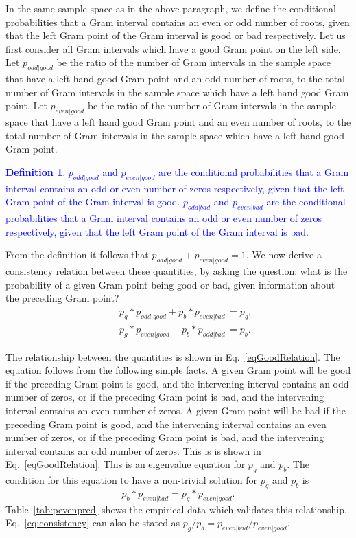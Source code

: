 \documentclass[twoside]{article}
\theoremstyle{definition}
\newtheorem{defn}{Definition}
\begin{document}
In the same sample space as in the above paragraph, we define the conditional probabilities that a Gram interval contains an even or odd number of roots, given that the left Gram point of the Gram interval is good or bad respectively. Let us first consider all Gram intervals which have a good Gram point on the left side. Let $p_{odd|good}$ be the ratio of the number of  Gram intervals in the sample space that have a left hand good Gram point and an odd number of roots, to the total number of Gram intervals in the sample space which have a left hand good Gram point. Let $p_{even|good}$ be the ratio of the number of  Gram intervals in the sample space that have a left hand good Gram point and an even number of roots, to the total number of Gram intervals in the sample space which have a left hand good Gram point. 
\textcolor{blue}{
\begin{defn}\label{poddgood}
$p_{odd|good}$ and $p_{even|good}$ are the conditional probabilities that a Gram interval contains an odd or even number of zeros respectively, given that the left Gram point of the Gram interval is good. $p_{odd|bad}$ and $p_{even|bad}$ are the conditional probabilities that a Gram interval contains an odd or even number of zeros respectively, given that the left Gram point of the Gram interval is bad.
\end{defn} 
}
From the definition it follows that $p_{odd|good} + p_{even|good} = 1$.  
We now derive a consistency relation between these quantities, by asking the question: what is the probability of a given Gram point being good or bad, given information about the preceding Gram point? 
\begin{eqnarray}
&&p_g*p_{odd|good}  + p_b*p_{even|bad}\, =  p_g,\nonumber\\
&&p_g*p_{even|good} + p_b*p_{odd|bad}\, = p_b.
\label{eqGoodRelation}
\end{eqnarray}

The relationship between the quantities is shown in Eq.~\ref{eqGoodRelation}. The equation follows from the following simple facts. A given Gram point will be good if the preceding Gram point is good, and the intervening interval contains an odd number of zeros, or if the preceding Gram point is bad, and the intervening interval contains an even number of zeros. A given Gram point will be bad if the preceding Gram point is good, and the intervening interval contains an even number of zeros, or if the preceding Gram point is bad, and the intervening interval contains an odd number of zeros. This is is shown in Eq.~\ref{eqGoodRelation}. This is an eigenvalue equation for  $p_g$ and $p_b$. The condition for this equation to have a non-trivial solution for  $p_g$ and $p_b$ is
\begin{equation}
p_b*p_{even|bad} = p_g*p_{even|good}.
\label{eq:consistency}
\end{equation}
Table~\ref{tab:pevenpred} shows the empirical data which validates this relationship. Eq.~\ref{eq:consistency} can also be stated as $p_g/p_b = p_{even|bad} /p_{even|good}$.
\end{document}
